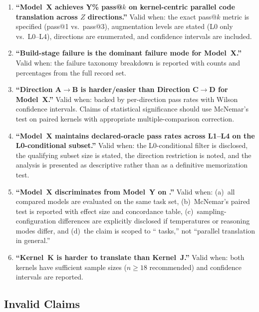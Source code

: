 \begin{enumerate}
  \item \textbf{``Model~X achieves Y\% pass@$k$ on kernel-centric parallel
    code translation across $Z$ directions.''} Valid when: the exact pass@$k$
    metric is specified (pass@1 vs.\ pass@3), augmentation levels are stated
    (L0 only vs.\ L0--L4), directions are enumerated, and confidence intervals
    are included.

  \item \textbf{``Build-stage failure is the dominant failure mode for
    Model~X.''} Valid when: the failure taxonomy breakdown is reported with
    counts and percentages from the full record set.

  \item \textbf{``Direction A$\to$B is harder/easier than Direction C$\to$D
    for Model~X.''} Valid when: backed by per-direction pass rates with Wilson
    confidence intervals. Claims of statistical significance should use
    McNemar's test on paired kernels with appropriate multiple-comparison
    correction.

  \item \textbf{``Model~X maintains declared-oracle pass rates across
    L1--L4 on the L0-conditional subset.''} Valid when: the L0-conditional filter is disclosed, the
    qualifying subset size is stated, the direction restriction is noted, and
    the analysis is presented as descriptive rather than as a definitive
    memorization test.

  \item \textbf{``Model~X discriminates from Model~Y on \parbench{}.''} Valid
    when: (a)~all compared models are evaluated on the same task set, (b)~McNemar's
    paired test is reported with effect size and concordance table,
    (c)~sampling-configuration differences are explicitly disclosed if
    temperatures or reasoning modes differ, and (d)~the claim is scoped to
    ``\parbench{} tasks,'' not ``parallel translation in general.''

  \item \textbf{``Kernel~K is harder to translate than Kernel~J.''} Valid
    when: both kernels have sufficient sample sizes ($n \geq 18$ recommended)
    and confidence intervals are reported.
\end{enumerate}

\subsection{Invalid Claims}
\label{sec:ec-invalid}

